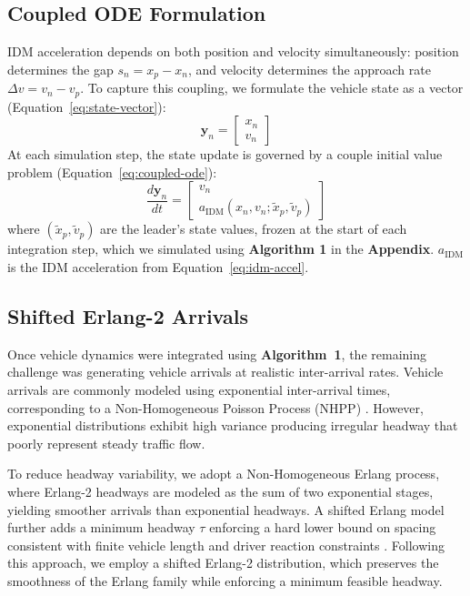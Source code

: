 \documentclass{scspaperproc}
\theoremstyle{scsthe}
\begin{document}
\subsection{Coupled ODE Formulation}
IDM acceleration depends on both position and velocity simultaneously: position determines the gap $s_n = x_p - x_n$, and velocity determines the approach rate $\Delta v = v_n - v_p$. To capture this coupling, we formulate the vehicle state as a vector (Equation~\eqref{eq:state-vector}):
\begin{equation}
\label{eq:state-vector}
\mathbf{y}_n = \begin{bmatrix} x_n \\ v_n \end{bmatrix}
\end{equation}
At each simulation step, the state update is governed by a couple initial value problem (Equation~\eqref{eq:coupled-ode}):
\begin{equation}
\label{eq:coupled-ode}
\frac{d\mathbf{y}_n}{dt} = \begin{bmatrix} v_n \\ a_{\text{IDM}}(x_n, v_n; \tilde{x}_p, \tilde{v}_p) \end{bmatrix}
\end{equation}
where $(\tilde{x}_p, \tilde{v}_p)$ are the leader's state values, frozen at the start of each integration step, which we simulated using \textbf{Algorithm 1} in the
\textbf{Appendix}. $a_{\text{IDM}}$ is the IDM acceleration from Equation~\eqref{eq:idm-accel}.

\subsection{Shifted Erlang-2 Arrivals}

Once vehicle dynamics were integrated using \textbf{Algorithm~1}, the remaining challenge was generating vehicle arrivals at realistic inter-arrival rates. Vehicle arrivals are commonly modeled using exponential inter-arrival times, corresponding to a Non-Homogeneous Poisson Process (NHPP) \cite{law2007simulation}. However, exponential distributions exhibit high variance producing irregular headway that poorly represent steady traffic flow.

To reduce headway variability, we adopt a Non-Homogeneous Erlang process, where Erlang-2 headways are modeled as the sum of two exponential stages, yielding smoother arrivals than exponential headways. A shifted Erlang model further adds a minimum headway $\tau$ enforcing a hard lower bound on spacing consistent with finite vehicle length and driver reaction constraints \cite{cowan1975useful}. Following this approach, we employ a shifted Erlang-2 distribution, which preserves the smoothness of the Erlang family while enforcing a minimum feasible headway.
\end{document}
